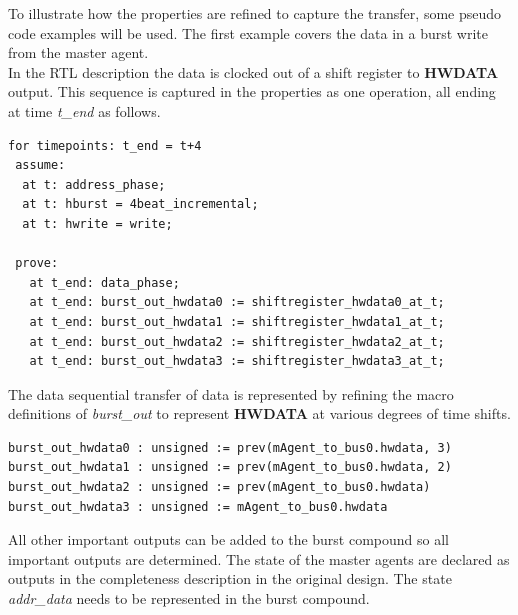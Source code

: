 To illustrate how the properties are refined to capture the transfer, some pseudo code examples will be used. The first example covers the data in a burst write from the master agent. \\
In the RTL description the data is clocked out of a shift register to \textbf{HWDATA} output. This sequence is captured in the properties as one operation, all ending at time \textit{t\_end} as follows.
\begin{lstlisting}
for timepoints: t_end = t+4
 assume:
  at t: address_phase;
  at t: hburst = 4beat_incremental; 
  at t: hwrite = write;

 prove:
   at t_end: data_phase;
   at t_end: burst_out_hwdata0 := shiftregister_hwdata0_at_t; 
   at t_end: burst_out_hwdata1 := shiftregister_hwdata1_at_t; 
   at t_end: burst_out_hwdata2 := shiftregister_hwdata2_at_t;
   at t_end: burst_out_hwdata3 := shiftregister_hwdata3_at_t;
\end{lstlisting}

The data sequential transfer of data is represented by refining the macro definitions of \textit{burst\_out} to represent \textbf{HWDATA} at various degrees
of time shifts. 
 
\begin{lstlisting}
burst_out_hwdata0 : unsigned := prev(mAgent_to_bus0.hwdata, 3) 
burst_out_hwdata1 : unsigned := prev(mAgent_to_bus0.hwdata, 2) 
burst_out_hwdata2 : unsigned := prev(mAgent_to_bus0.hwdata)
burst_out_hwdata3 : unsigned := mAgent_to_bus0.hwdata 
\end{lstlisting}

All other important outputs can be added to the burst compound so all important outputs are determined. The state of the master agents are declared as outputs
in the completeness description in the original design. The state \textit{addr\_data} needs to be represented in the burst compound. 


